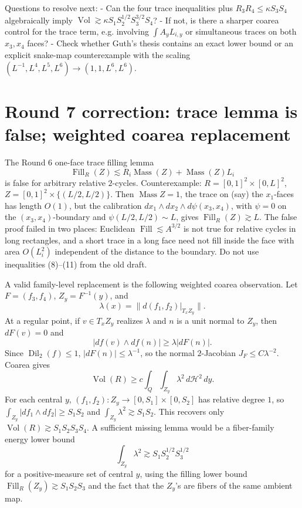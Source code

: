 \documentclass[12pt]{article}
\newcommand{\Dil}{\operatorname{Dil}}
\newcommand{\Vol}{\operatorname{Vol}}
\newcommand{\Fill}{\operatorname{Fill}}
\newcommand{\Mass}{\operatorname{Mass}}
\begin{document}
Questions to resolve next:
- Can the four trace inequalities plus \(R_3R_4\le\kappa S_3S_4\) algebraically
imply \(\Vol\gtrsim \kappa S_1S_2^{1/2}S_3^{3/2}S_4\)?
- If not, is there a sharper coarea control for the trace term, e.g. involving
\(\int A_yL_{i,y}\) or simultaneous traces on both \(x_3,x_4\) faces?
- Check whether Guth's thesis contains an exact lower bound or an explicit
snake-map counterexample with the scaling
\((L^{-1},L^4,L^5,L^6)\to(1,1,L^6,L^6)\).




\section*{Round 7 correction: trace lemma is false; weighted coarea replacement}

The Round 6 one-face trace filling lemma
\[
 \Fill_R(Z)\lesssim R_i\Mass(Z)+\Mass(Z)L_i
\]
is false for arbitrary relative \(2\)-cycles.  Counterexample:
\(R=[0,1]^2\times[0,L]^2\), \(Z=[0,1]^2\times\{(L/2,L/2)\}\).  Then
\(\Mass Z=1\), the trace on (say) the \(x_1\)-faces has length \(O(1)\), but the
calibration \(dx_1\wedge dx_2\wedge d\psi(x_3,x_4)\), with
\(\psi=0\) on the \((x_3,x_4)\)-boundary and \(\psi(L/2,L/2)\sim L\), gives
\(\Fill_R(Z)\gtrsim L\).  The false proof failed in two places: Euclidean
\(\Fill\lesssim A^{3/2}\) is not true for relative cycles in long rectangles, and
a short trace in a long face need not fill inside the face with area \(O(L_i^2)\)
independent of the distance to the boundary.  Do not use inequalities (8)--(11)
from the old draft.

A valid family-level replacement is the following weighted coarea observation.
Let \(F=(f_3,f_4)\), \(Z_y=F^{-1}(y)\), and
\[
 \lambda(x)=\|d(f_1,f_2)|_{T_xZ_y}\|.
\]
At a regular point, if \(v\in T_xZ_y\) realizes \(\lambda\) and \(n\) is a unit normal
to \(Z_y\), then \(dF(v)=0\) and
\[
 |df(v)\wedge df(n)|\ge \lambda |dF(n)|.
\]
Since \(\Dil_2(f)\le1\), \(|dF(n)|\le\lambda^{-1}\), so the normal \(2\)-Jacobian
\(J_F\le C\lambda^{-2}\).  Coarea gives
\[
 \Vol(R)\ge c\int_Q\int_{Z_y}\lambda^2\,d\mathcal H^2\,dy.
\]
For each central \(y\), \((f_1,f_2):Z_y\to[0,S_1]\times[0,S_2]\) has relative
degree \(1\), so \(\int_{Z_y}|df_1\wedge df_2|\ge S_1S_2\) and
\(\int_{Z_y}\lambda^2\gtrsim S_1S_2\).  This recovers only
\(\Vol(R)\gtrsim S_1S_2S_3S_4\).  A sufficient missing lemma would be a
fiber-family energy lower bound
\[
 \int_{Z_y}\lambda^2\gtrsim S_1S_2^{1/2}S_3^{1/2}
\]
for a positive-measure set of central \(y\), using the filling lower bound
\(\Fill_R(Z_y)\gtrsim S_1S_2S_3\) and the fact that the \(Z_y\)'s are fibers of the
same ambient map.
\end{document}
